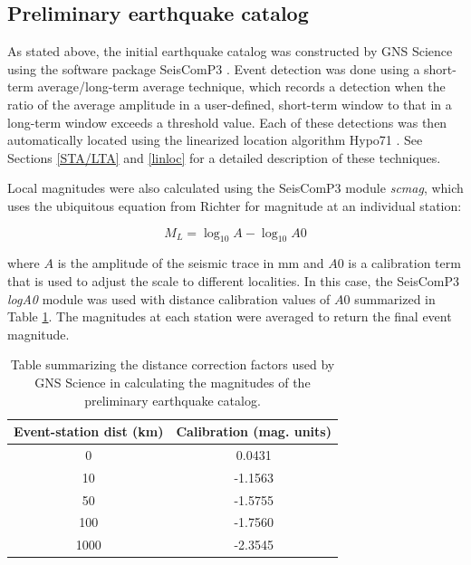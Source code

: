 \subsection{Preliminary earthquake catalog}\label{GNS_cat}
As stated above, the initial earthquake catalog was constructed by GNS Science using the software package SeisComP3 \citep{Weber2007}. Event detection was done using a short-term average\slash{long-term average} technique, which records a detection when the ratio of the average amplitude in a user-defined, short-term window to that in a long-term window exceeds a threshold value. Each of these detections was then automatically located using the linearized location algorithm Hypo71 \citep{Lee_1972}. See Sections \ref{STA/LTA} and \ref{linloc} for a detailed description of these techniques.

Local magnitudes were also calculated using the SeisComP3 module \textit{scmag}, which uses the ubiquitous equation from Richter \citep{richter1935instrumental} for magnitude at an individual station:

\begin{equation}
M_L = \log_{10}{A} - \log_{10}A0
\end{equation}

where $A$ is the amplitude of the seismic trace in mm and $A0$ is a calibration term that is used to adjust the scale to different localities. In this case, the SeisComP3 \textit{logA0} module was used with distance calibration values of $A0$ summarized in Table \ref{table_A0}. The magnitudes at each station were averaged to return the final event magnitude.
\begin{table}
\centering
\begin{tabular}{cc}
    {Event-station dist (km)} & {Calibration (mag. units)} \\ \midrule
    0  & 0.0431 \\
    10  & -1.1563  \\
    50  & -1.5755  \\
    100  & -1.7560  \\
    1000  & -2.3545   \\
\end{tabular}
\caption{{Table summarizing the distance correction factors used by GNS Science in calculating the magnitudes of the preliminary earthquake catalog.}}
\label{table_A0}
\end{table}

